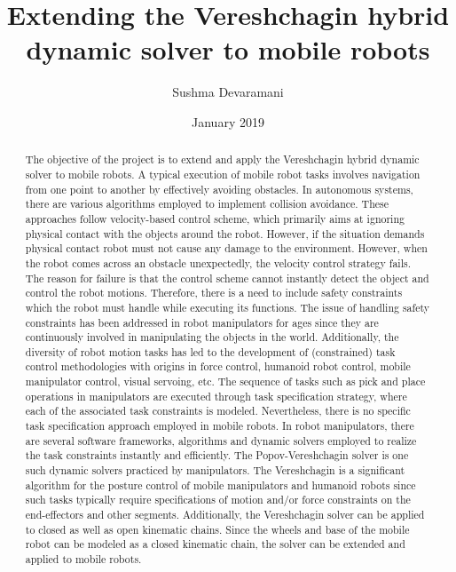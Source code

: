 \documentclass[rnd]{mas_report}
\author{Sushma Devaramani}
\title{Extending the Vereshchagin hybrid dynamic solver to mobile robots}
\date{January  2019}
\begin{document}
	\begin{titlepage}
		\maketitle
	\end{titlepage}
	
	
	\pagestyle{plain}
	
	
	\cleardoublepage
	\statementpage
	
	\begin{abstract}
		The objective of the project is to extend and apply the Vereshchagin hybrid dynamic solver to mobile robots. A typical execution of mobile robot tasks involves navigation from one point to another by effectively avoiding obstacles. In autonomous systems, there are various algorithms employed to implement collision avoidance. These approaches follow velocity-based control scheme, which primarily aims at ignoring physical contact with the objects around the robot. However, if the situation demands physical contact robot must not cause any damage to the environment. However, when the robot comes across an obstacle unexpectedly, the velocity control strategy fails. The reason for failure is that the control scheme cannot instantly detect the object and control the robot motions. Therefore, there is a need to include safety constraints which the robot must handle while executing its functions. The issue of handling safety constraints has been addressed in robot manipulators for ages since they are continuously involved in manipulating the objects in the world. Additionally, the diversity of robot motion tasks has led to the development of (constrained) task control methodologies with origins in force control, humanoid robot control, mobile manipulator control, visual servoing, etc. The sequence of tasks such as pick and place operations in manipulators are executed through task specification strategy, where each of the associated task constraints is modeled. Nevertheless, there is no specific task specification approach employed in mobile robots. In robot manipulators, there are several software frameworks, algorithms and dynamic solvers employed to realize the task constraints instantly and efficiently. The Popov-Vereshchagin solver is one such dynamic solvers practiced by manipulators. The Vereshchagin is a significant algorithm for the posture control of mobile manipulators and humanoid robots since such tasks typically require specifications of motion and/or force constraints on the end-effectors and other segments. Additionally, the Vereshchagin solver can be applied to closed as well as open kinematic chains. Since the wheels and base of the mobile robot can be modeled as a closed kinematic chain, the solver can be extended and applied to mobile robots.
	\end{abstract}
	
\end{document}

